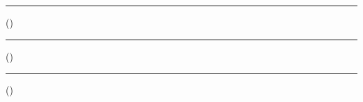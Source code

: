 \noindent
\begin{minipage}[t]{0.31\textwidth}
	\centering
	\rule{0.9\linewidth}{0.4pt}\par\vspace{3pt}
	\textbf{\printStuNameA}\par
	{\small (\printStuUSNA)}
\end{minipage}\hfill
\begin{minipage}[t]{0.31\textwidth}
	\centering
	\rule{0.9\linewidth}{0.4pt}\par\vspace{3pt}
	\textbf{\printStuNameB}\par
	{\small (\printStuUSNB)}
\end{minipage}\hfill
\begin{minipage}[t]{0.31\textwidth}
	\centering
	\rule{0.9\linewidth}{0.4pt}\par\vspace{3pt}
	\textbf{\printStuNameC}\par
	{\small (\printStuUSNC)}
\end{minipage}
\vspace*{0.2cm}
\thispagestyle{empty}
